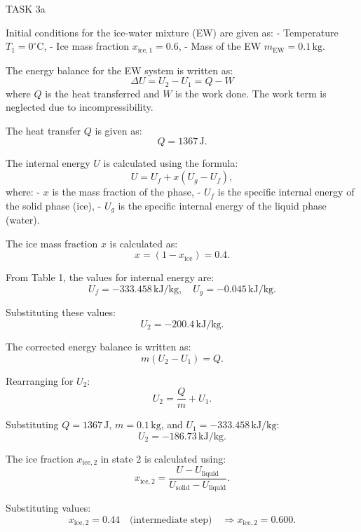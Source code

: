 TASK 3a

Initial conditions for the ice-water mixture (EW) are given as:
- Temperature \( T_1 = 0^\circ\text{C} \),
- Ice mass fraction \( x_{\text{ice},1} = 0.6 \),
- Mass of the EW \( m_{\text{EW}} = 0.1 \, \text{kg} \).

The energy balance for the EW system is written as:
\[
\Delta U = U_2 - U_1 = Q - W
\]
where \( Q \) is the heat transferred and \( W \) is the work done. The work term is neglected due to incompressibility.

The heat transfer \( Q \) is given as:
\[
Q = 1367 \, \text{J}.
\]

The internal energy \( U \) is calculated using the formula:
\[
U = U_f + x (U_g - U_f),
\]
where:
- \( x \) is the mass fraction of the phase,
- \( U_f \) is the specific internal energy of the solid phase (ice),
- \( U_g \) is the specific internal energy of the liquid phase (water).

The ice mass fraction \( x \) is calculated as:
\[
x = (1 - x_{\text{ice}}) = 0.4.
\]

From Table 1, the values for internal energy are:
\[
U_f = -333.458 \, \text{kJ/kg}, \quad U_g = -0.045 \, \text{kJ/kg}.
\]

Substituting these values:
\[
U_2 = -200.4 \, \text{kJ/kg}.
\]

The corrected energy balance is written as:
\[
m (U_2 - U_1) = Q.
\]

Rearranging for \( U_2 \):
\[
U_2 = \frac{Q}{m} + U_1.
\]

Substituting \( Q = 1367 \, \text{J} \), \( m = 0.1 \, \text{kg} \), and \( U_1 = -333.458 \, \text{kJ/kg} \):
\[
U_2 = -186.73 \, \text{kJ/kg}.
\]

The ice fraction \( x_{\text{ice},2} \) in state 2 is calculated using:
\[
x_{\text{ice},2} = \frac{U - U_{\text{liquid}}}{U_{\text{solid}} - U_{\text{liquid}}}.
\]

Substituting values:
\[
x_{\text{ice},2} = 0.44 \quad \text{(intermediate step)} \quad \Rightarrow x_{\text{ice},2} = 0.600.
\]